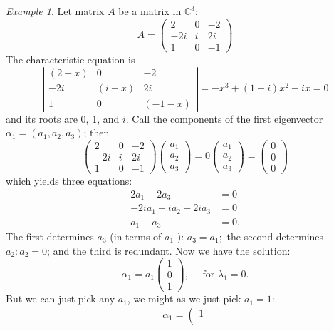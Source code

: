 \documentclass{book}
\theoremstyle{remark}
\newtheorem{example}{Example}[section]
\theoremstyle{definition}
\begin{document}
\begin{example}
    Let matrix $A$ be a matrix in $\mathbb{C}^3$:
$$
A=\left(\begin{array}{ccc}
2 & 0 & -2 \\
-2 i & i & 2 i \\
1 & 0 & -1
\end{array}\right)
$$
The characteristic equation is
$$
\left|\begin{array}{ccc}
(2-x) & 0 & -2 \\
-2 i & (i-x) & 2 i \\
1 & 0 & (-1-x)
\end{array}\right|=-x^3+(1+i) x^2-i x=0
$$
and its roots are 0, 1, and $i$. Call the components of the first eigenvector $\alpha_1 = \left(a_1, a_2, a_3\right)$; then
$$
\left(\begin{array}{ccc}
2 & 0 & -2 \\
-2 i & i & 2 i \\
1 & 0 & -1
\end{array}\right)\left(\begin{array}{l}
a_1 \\
a_2 \\
a_3
\end{array}\right)=0\left(\begin{array}{l}
a_1 \\
a_2 \\
a_3
\end{array}\right)=\left(\begin{array}{l}
0 \\
0 \\
0
\end{array}\right)
$$
which yields three equations:
$$
\begin{aligned}
2 a_1-2 a_3 & =0 \\
-2 i a_1+i a_2+2 i a_3 & =0 \\
a_1-a_3 & =0 .
\end{aligned}
$$
The first determines $a_3$ (in terms of $a_1$ ): $a_3=a_1 ;$ the second determines $a_2: a_2=0$; and the third is redundant. Now we have the solution: 
$$
\alpha_1=a_1\left(\begin{array}{l}
1 \\
0 \\
1
\end{array}\right), \quad \text { for } \lambda_1=0.
$$
But we can just pick any $a_1$, we might as we just pick $a_1 = 1$: $$
\alpha_1=\left(\begin{array}{l}
1 \\

\end{array}$$
\end{example}
\end{document}

